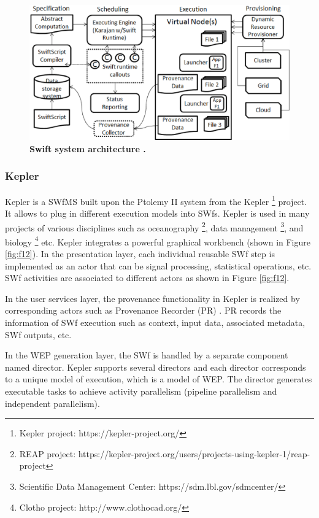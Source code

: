 \begin{figure}
\begin{centering}
\captionsetup{justification=centering}
\includegraphics[width=129mm]{figures/f11}
\par\end{centering}

\caption{\textbf{Swift system architecture \cite{Zhao2007}. }}
\label{fig:f11} 
\end{figure}


\subsubsection{Kepler}
Kepler \cite{Altintas2004,Altintas2004a} is a SWfMS built upon the Ptolemy
II system from the Kepler%
\footnote{Kepler project: https://kepler-project.org/%
} project. It allows to plug in different execution models into SWfs.
Kepler is used in many projects of various disciplines such as oceanography%
\footnote{REAP project: https://kepler-project.org/users/projects-using-kepler-1/reap-project%
}, data management%
\footnote{Scientific Data Management Center: https://sdm.lbl.gov/sdmcenter/%
}, and biology%
\footnote{Clotho project: http://www.clothocad.org/%
} etc. Kepler integrates a powerful graphical workbench (shown in Figure \ref{fig:f12}).
In the presentation layer, each individual reusable SWf step
is implemented as an actor that can be signal processing, statistical
operations, etc. SWf activities are associated to different actors as shown in Figure \ref{fig:f12}. 

In the user services layer, the provenance functionality in Kepler is realized
by corresponding actors such as Provenance Recorder (PR)
\cite{Altintas2006}. PR records the information of SWf execution
such as context, input data, associated metadata, SWf
outputs, etc. 

In the WEP generation layer, the SWf is handled by a separate component named director.
Kepler supports several directors and each director corresponds to a unique model of execution, which is a model of WEP. 
The director generates executable tasks to achieve activity parallelism (pipeline parallelism and independent parallelism).

